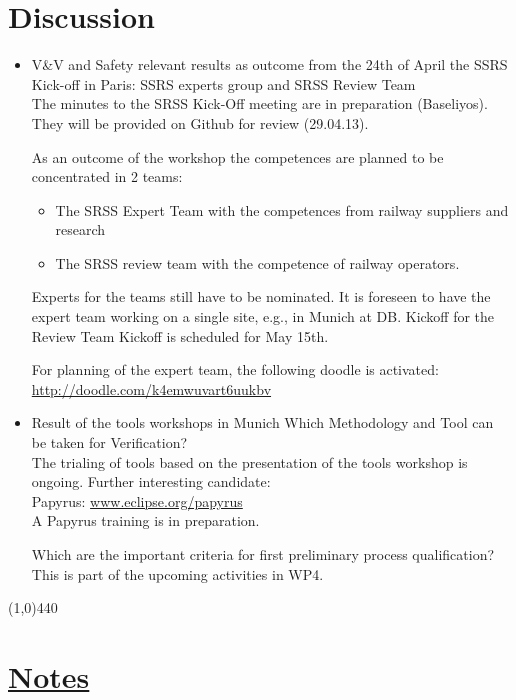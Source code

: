 \documentclass[a4paper, 11pt]{article}
\begin{document}
\section{Discussion}
\begin{itemize}
\item V\&V and Safety relevant results as outcome from the 24th of April the SSRS Kick-off in Paris:
SSRS experts group and SRSS Review Team\\

The minutes to the SRSS Kick-Off meeting are in preparation (Baseliyos). They will be provided on Github for review (29.04.13). 

As an outcome of the workshop the competences are planned to be concentrated in 2 teams:
\begin{itemize}
\item The SRSS Expert Team with the competences from railway suppliers and research 
\item The SRSS review team with the competence of railway operators.
\end {itemize}
Experts for the teams still have to be nominated. It is foreseen to have the expert team working on a single site, e.g., in Munich at DB. Kickoff for the Review Team Kickoff is scheduled for May 15th.

For planning of the expert team, the following doodle is activated:\\
\url{http://doodle.com/k4emwuvart6uukbv}

\item Result of the tools workshops in Munich
Which Methodology and Tool can be taken for Verification?\\
The trialing of tools based on the presentation of the tools workshop is ongoing. 
Further interesting candidate:\\
Papyrus: \url{www.eclipse.org/papyrus}\\

A Papyrus training is in preparation.

Which are the important criteria for first preliminary process qualification?\\
This is part of the upcoming activities in WP4.
\end{itemize}


\line(1,0){440}
\section{\underline{Notes}}
\end{document}
